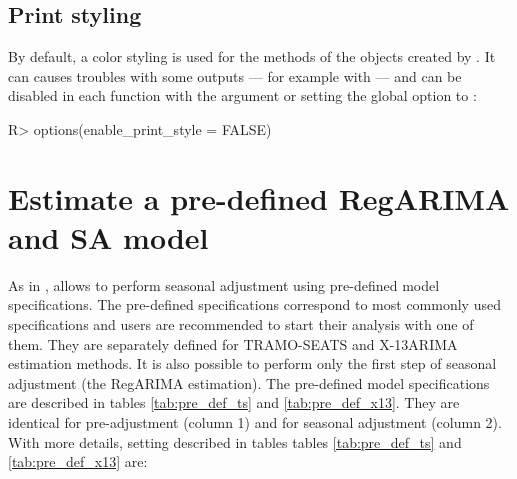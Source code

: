 \documentclass[article]{jss}
\begin{document}
\hypertarget{print-styling}{%
\subsection{Print styling}\label{print-styling}}

By default, a color styling is used for the  methods of the
objects created by . It can causes troubles with some
outputs --- for example with  \citep{rmarkdown} --- and
can be disabled in each  function with the argument
 or setting the global option
 to :

\begin{CodeChunk}

\begin{CodeInput}
R> options(enable_print_style = FALSE)
\end{CodeInput}
\end{CodeChunk}

\hypertarget{pre-def-est}{%
\section{Estimate a pre-defined RegARIMA and SA
model}\label{pre-def-est}}

As in ,  allows to perform seasonal
adjustment using pre-defined model specifications. The pre-defined
specifications correspond to most commonly used specifications and users
are recommended to start their analysis with one of them. They are
separately defined for TRAMO-SEATS and X-13ARIMA estimation methods. It
is also possible to perform only the first step of seasonal adjustment
(the RegARIMA estimation). The pre-defined model specifications are
described in tables \ref{tab:pre_def_ts} and \ref{tab:pre_def_x13}. They
are identical for pre-adjustment (column 1) and for seasonal adjustment
(column 2). With more details, setting described in tables tables
\ref{tab:pre_def_ts} and \ref{tab:pre_def_x13} are:
\end{document}
